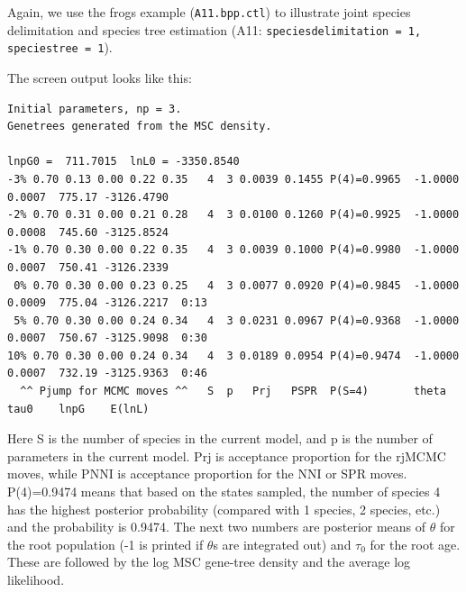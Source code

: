 \documentclass[a4paper]{book}
\numberwithin{equation}{section} \renewcommand{\baselinestretch}{0.55}
\begin{document}
Again, we use the frogs example (\texttt{A11.bpp.ctl}) to illustrate
joint species delimitation and species tree estimation (A11:
\texttt{speciesdelimitation = 1, speciestree = 1}).

The screen output looks like this:

\begin{verbatim}
Initial parameters, np = 3.
Genetrees generated from the MSC density.

lnpG0 =  711.7015  lnL0 = -3350.8540
-3% 0.70 0.13 0.00 0.22 0.35   4  3 0.0039 0.1455 P(4)=0.9965  -1.0000 0.0007  775.17 -3126.4790
-2% 0.70 0.31 0.00 0.21 0.28   4  3 0.0100 0.1260 P(4)=0.9925  -1.0000 0.0008  745.60 -3125.8524
-1% 0.70 0.30 0.00 0.22 0.35   4  3 0.0039 0.1000 P(4)=0.9980  -1.0000 0.0007  750.41 -3126.2339
 0% 0.70 0.30 0.00 0.23 0.25   4  3 0.0077 0.0920 P(4)=0.9845  -1.0000 0.0009  775.04 -3126.2217  0:13
 5% 0.70 0.30 0.00 0.24 0.34   4  3 0.0231 0.0967 P(4)=0.9368  -1.0000 0.0007  750.67 -3125.9098  0:30
10% 0.70 0.30 0.00 0.24 0.34   4  3 0.0189 0.0954 P(4)=0.9474  -1.0000 0.0007  732.19 -3125.9363  0:46
  ^^ Pjump for MCMC moves ^^   S  p   Prj   PSPR  P(S=4)       theta   tau0    lnpG    E(lnL)
\end{verbatim}

Here S is the number of species in the current model, and p is the
number of parameters in the current model.  Prj is acceptance
proportion for the rjMCMC moves, while PNNI is acceptance proportion
for the NNI or SPR moves.  P(4)=0.9474 means that based on the states
sampled, the number of species 4 has the highest posterior probability
(compared with 1 species, 2 species, etc.) and the probability is
0.9474. The next two numbers are posterior means of $\theta$ for the
root population (-1 is printed if $\theta$s are integrated out) and
$\tau_0$ for the root age.  These are followed by the log MSC
gene-tree density and the average log likelihood.
\end{document}
